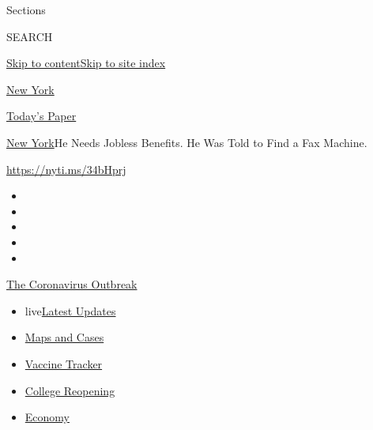 Sections

SEARCH

\protect\hyperlink{site-content}{Skip to
content}\protect\hyperlink{site-index}{Skip to site index}

\href{https://www.nytimes3xbfgragh.onion/section/nyregion}{New York}

\href{https://myaccount.nytimes3xbfgragh.onion/auth/login?response_type=cookie\&client_id=vi}{}

\href{https://www.nytimes3xbfgragh.onion/section/todayspaper}{Today's
Paper}

\href{/section/nyregion}{New York}\textbar{}He Needs Jobless Benefits.
He Was Told to Find a Fax Machine.

\url{https://nyti.ms/34bHprj}

\begin{itemize}
\item
\item
\item
\item
\item
\end{itemize}

\href{https://www.nytimes3xbfgragh.onion/news-event/coronavirus?action=click\&pgtype=Article\&state=default\&region=TOP_BANNER\&context=storylines_menu}{The
Coronavirus Outbreak}

\begin{itemize}
\tightlist
\item
  live\href{https://www.nytimes3xbfgragh.onion/2020/08/04/world/coronavirus-cases.html?action=click\&pgtype=Article\&state=default\&region=TOP_BANNER\&context=storylines_menu}{Latest
  Updates}
\item
  \href{https://www.nytimes3xbfgragh.onion/interactive/2020/us/coronavirus-us-cases.html?action=click\&pgtype=Article\&state=default\&region=TOP_BANNER\&context=storylines_menu}{Maps
  and Cases}
\item
  \href{https://www.nytimes3xbfgragh.onion/interactive/2020/science/coronavirus-vaccine-tracker.html?action=click\&pgtype=Article\&state=default\&region=TOP_BANNER\&context=storylines_menu}{Vaccine
  Tracker}
\item
  \href{https://www.nytimes3xbfgragh.onion/2020/08/02/us/covid-college-reopening.html?action=click\&pgtype=Article\&state=default\&region=TOP_BANNER\&context=storylines_menu}{College
  Reopening}
\item
  \href{https://www.nytimes3xbfgragh.onion/live/2020/08/04/business/stock-market-today-coronavirus?action=click\&pgtype=Article\&state=default\&region=TOP_BANNER\&context=storylines_menu}{Economy}
\end{itemize}


